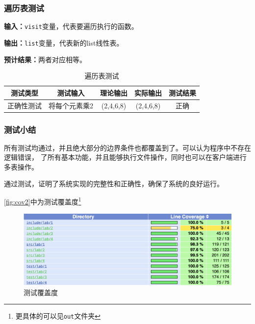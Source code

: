 \subsubsection{遍历表测试}
\textbf{输入：}\texttt{visit}变量，代表要遍历执行的函数。
\par
\textbf{输出：}\texttt{list}变量，代表新的list线性表。
\par
\textbf{预计结果：}两者对应相等。
\begin{table}[h]
    \caption{遍历表测试}
    \centering
    \begin{tabular}{@{}ccccc@{}}
        \toprule
        \multicolumn{1}{c}{测试类型}    & \multicolumn{1}{c}{测试输入} & \multicolumn{1}{c}{理论输出} & \multicolumn{1}{c}{实际输出} &
        \multicolumn{1}{c}{测试结果} \\ \midrule
        \multicolumn{1}{c|}{正确性测试}  & 将每个元素乘2&(2,4,6,8)&(2,4,6,8)&正确\\ \bottomrule
    \end{tabular}
    \label{tab:traversetest2}
\end{table}

\subsubsection{测试小结}
所有测试均通过，并且绝大部分的边界条件也都覆盖到了。可以认为程序中不存在逻辑错误，
了所有基本功能，并且能够执行文件操作，同时也可以在客户端进行多表操作。
\par
通过测试，证明了系统实现的完整性和正确性，确保了系统的良好运行。
\par
\autoref{fig:cov2}中为测试覆盖度\footnote{更具体的可以见\texttt{out}文件夹}

\begin{figure}
\centering
\caption{测试覆盖度}\label{fig:cov2}
\includegraphics[scale=.5]{cov.png}
\end{figure}

